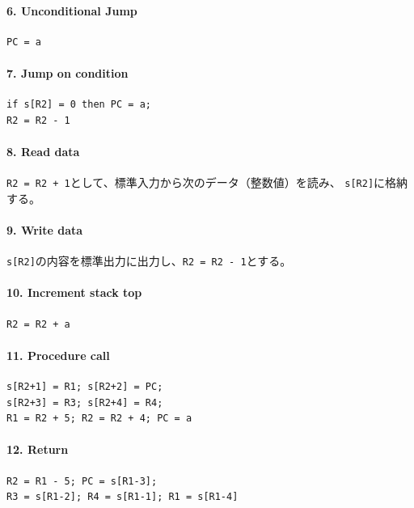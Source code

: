 \documentclass[dvipdfmx,a4j]{jbook}
\begin{document}
\paragraph{6. Unconditional Jump}
\begin{verbatim}
PC = a
\end{verbatim}

\paragraph{7. Jump on condition}
\begin{verbatim}
if s[R2] = 0 then PC = a;
R2 = R2 - 1
\end{verbatim}

\paragraph{8. Read data}
\par \texttt{R2 = R2 + 1}として、標準入力から次のデータ（整数値）を読み、
\texttt{s[R2]}に格納する。

\paragraph{9. Write data}
\par \texttt{s[R2]}の内容を標準出力に出力し、\texttt{R2 = R2 - 1}とする。

\paragraph{10. Increment stack top}
\begin{verbatim}
R2 = R2 + a
\end{verbatim}

\paragraph{11. Procedure call}
\begin{verbatim}
s[R2+1] = R1; s[R2+2] = PC;
s[R2+3] = R3; s[R2+4] = R4;
R1 = R2 + 5; R2 = R2 + 4; PC = a
\end{verbatim}

\paragraph{12. Return}
\begin{verbatim}
R2 = R1 - 5; PC = s[R1-3];
R3 = s[R1-2]; R4 = s[R1-1]; R1 = s[R1-4]
\end{verbatim}
\end{document}
